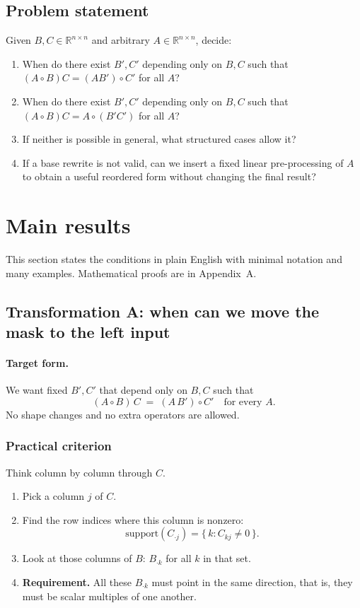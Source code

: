 \documentclass[11pt,a4paper]{article}
\theoremstyle{definition}
\newcommand{\R}{\mathbb{R}}
\newcommand{\Had}{\circ}
\begin{document}
\subsection{Problem statement}
Given $B,C\in\R^{n\times n}$ and arbitrary $A\in\R^{n\times n}$, decide:
\begin{enumerate}[label=\textbf{Q\arabic*.},wide]
  \item When do there exist $B',C'$ depending only on $B,C$ such that $(A\Had B)C=(AB')\Had C'$ for all $A$?
  \item When do there exist $B',C'$ depending only on $B,C$ such that $(A\Had B)C=A\Had(B'C')$ for all $A$?
  \item If neither is possible in general, what structured cases allow it?
  \item If a base rewrite is not valid, can we insert a fixed linear pre-processing of $A$ to obtain a useful reordered form without changing the final result?
\end{enumerate}
\vspace{3cm}


\section{Main results}
\label{sec:dev-criteria}
This section states the conditions in plain English with minimal notation and many examples. Mathematical proofs are in Appendix~A.


\subsection{Transformation A: when can we move the mask to the left input}
\label{subsec:dev-A}

\paragraph{Target form.}
We want fixed $B',C'$ that depend only on $B,C$ such that
\[
(A \Had B)\,C \;=\; (A\,B') \Had C' \quad \text{for every } A.
\]
No shape changes and no extra operators are allowed.

\subsubsection*{Practical criterion}
Think column by column through $C$.

\begin{enumerate}[label=\arabic*)]
  \item Pick a column $j$ of $C$.
  \item Find the row indices where this column is nonzero:
        \[
        \mathrm{support}(C_{\cdot j})=\{\,k : C_{k j}\ne 0\,\}.
        \]
  \item Look at those columns of $B$: $B_{\cdot k}$ for all $k$ in that set.
  \item \textbf{Requirement.} All these $B_{\cdot k}$ must point in the same direction, that is, they must be scalar multiples of one another.
\end{enumerate}
\end{document}
